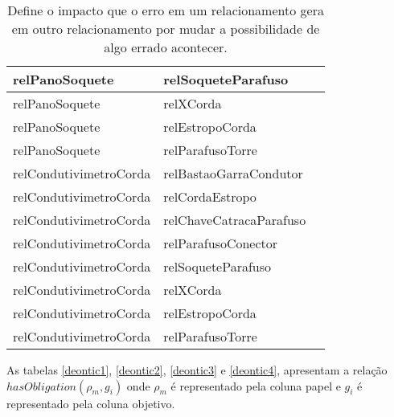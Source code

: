 \begin{table}[H]
\begin{tabular}{|l|l|l|}
relPanoSoquete                                  & relSoqueteParafuso                               \\ \hline
relPanoSoquete                                  & relXCorda                                        \\ \hline
relPanoSoquete                                  & relEstropoCorda                                  \\ \hline
relPanoSoquete                                  & relParafusoTorre                                 \\ \hline
relCondutivimetroCorda                          & relBastaoGarraCondutor                           \\ \hline
relCondutivimetroCorda                          & relCordaEstropo                                  \\ \hline
relCondutivimetroCorda                          & relChaveCatracaParafuso                          \\ \hline
relCondutivimetroCorda                          & relParafusoConector                              \\ \hline
relCondutivimetroCorda                          & relSoqueteParafuso                               \\ \hline
relCondutivimetroCorda                          & relXCorda                                        \\ \hline
relCondutivimetroCorda                          & relEstropoCorda                                  \\ \hline
relCondutivimetroCorda                          & relParafusoTorre                                 \\ \hline
\end{tabular}
\caption{Define o impacto que o erro em um relacionamento gera em outro relacionamento por mudar a possibilidade de algo errado acontecer.}
\label{relation3}
\end{table}


As tabelas \ref{deontic1}, \ref{deontic2}, \ref{deontic3} e \ref{deontic4},  apresentam a relação $hasObligation(\rho_m,g_i)$ onde $\rho_m$ é representado pela coluna papel e $g_i$ é representado pela coluna objetivo. 

